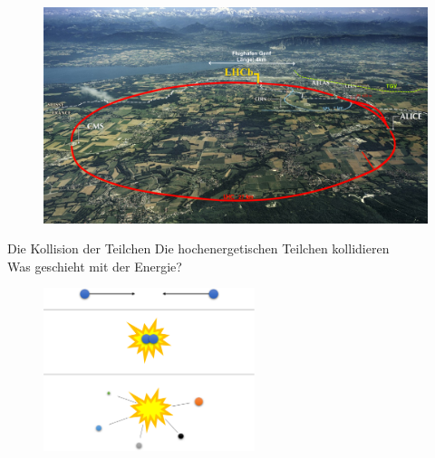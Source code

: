 \begin{frame}\addtocounter{framenumber}{-1}
\begin{figure}
\includegraphics[width=\textwidth]{Figures Introductory Lecture/LHCb Detector/LHC+GVA+TGV_DE.jpg}
\end{figure}
\end{frame}
\begin{frame}{Die Kollision der Teilchen}%
Die hochenergetischen Teilchen kollidieren\\
  Was geschieht mit der Energie? %
 \\ 
\begin{figure}[h]
       
       \includegraphics[width=0.55\textwidth]{Figures Introductory Lecture/LHCb Detector/Kollision.png}
        \label{fig:Kollision}
    \end{figure}
\end{frame}
